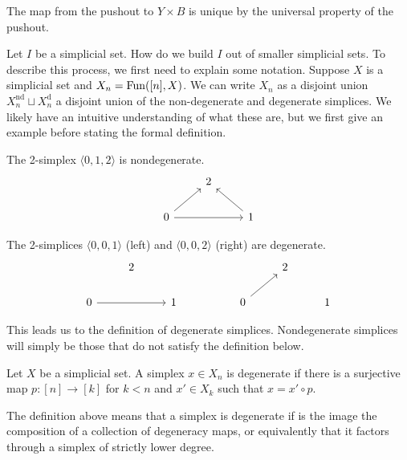 \begin{remark}
  The map from the pushout to $Y\times B$ is unique by the universal property of the pushout. 
\end{remark}
Let $I$ be a simplicial set. How do we build $I$ out of smaller simplicial sets. To describe this process, we first need to explain some notation. Suppose $X$ is a simplicial set and $X_{n}=\mathrm{Fun}([n],X)$. We can write $X_{n}$ as a disjoint union $X_{n}^{\mathrm{nd}}\sqcup X_{n}^{\mathrm{d}}$ a disjoint union of the non-degenerate and degenerate simplices. We likely have an intuitive understanding of what these are, but we first give an example before stating the formal definition. 
\begin{example}
  The 2-simplex $\langle0,1,2\rangle$ is nondegenerate. 
  $$%
  \begin{tikzcd}
    & 2 \\
    0 && 1
    \arrow[from=2-1, to=2-3]
    \arrow[from=2-3, to=1-2]
    \arrow[from=2-1, to=1-2]
  \end{tikzcd}$$
\end{example}
\begin{example}
  The 2-simplices $\langle0,0,1\rangle$ (left) and $\langle0,0,2\rangle$ (right) are degenerate. 
  $$%
  \begin{tikzcd}
    & 2 &&&& 2 \\
    0 && 1 && 0 && 1
    \arrow[from=2-1, to=2-3]
    \arrow[from=2-5, to=1-6]
  \end{tikzcd}$$
\end{example}
This leads us to the definition of degenerate simplices. Nondegenerate simplices will simply be those that do not satisfy the definition below. 
\begin{definition}
  Let $X$ be a simplicial set. A simplex $x\in X_{n}$ is degenerate if there is a surjective map $p:[n]\to [k]$ for $k<n$ and $x'\in X_{k}$ such that $x=x'\circ p$. 
\end{definition}
\begin{remark}
  The definition above means that a simplex is degenerate if is the image the composition of a collection of degeneracy maps, or equivalently that it factors through a simplex of strictly lower degree. 
\end{remark}
